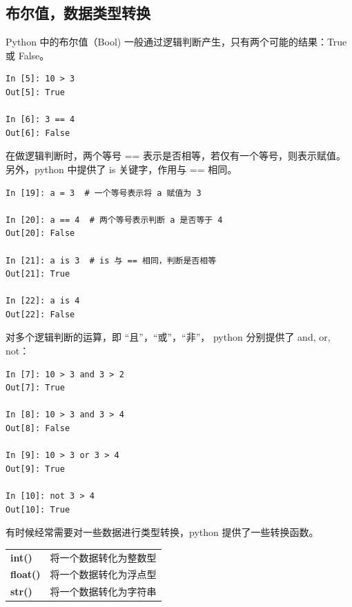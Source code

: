 \subsection{布尔值，数据类型转换}

Python 中的布尔值（Bool) 一般通过逻辑判断产生，只有两个可能的结果：True 或 False。

\begin{lstlisting}[Language=Python]
In [5]: 10 > 3
Out[5]: True

In [6]: 3 == 4
Out[6]: False
\end{lstlisting}

在做逻辑判断时，两个等号 == 表示是否相等，若仅有一个等号，则表示赋值。另外，python 中提供了 is 关键字，作用与 == 相同。

\begin{lstlisting}[Language=Python]
In [19]: a = 3  # 一个等号表示将 a 赋值为 3

In [20]: a == 4  # 两个等号表示判断 a 是否等于 4
Out[20]: False

In [21]: a is 3  # is 与 == 相同，判断是否相等
Out[21]: True

In [22]: a is 4
Out[22]: False
\end{lstlisting}

对多个逻辑判断的运算，即 ``且”，``或”，``非”， python 分别提供了 and, or, not：

\begin{lstlisting}[Language=Python]
In [7]: 10 > 3 and 3 > 2
Out[7]: True

In [8]: 10 > 3 and 3 > 4
Out[8]: False

In [9]: 10 > 3 or 3 > 4
Out[9]: True

In [10]: not 3 > 4
Out[10]: True
\end{lstlisting}

有时候经常需要对一些数据进行类型转换，python 提供了一些转换函数。

\begin{center}
\begin{tcolorbox} [title = python 的一些类型转换函数]
  \bf
  \begin{tcboutputlisting}
  \begin{tabular}{>{\bfseries}ll}
    int() &将一个数据转化为整数型\\
    float() & 将一个数据转化为浮点型\\
        str() &将一个数据转化为字符串\\
  \end{tabular}
\end{tcboutputlisting}
\end{tcolorbox}
\end{center}


